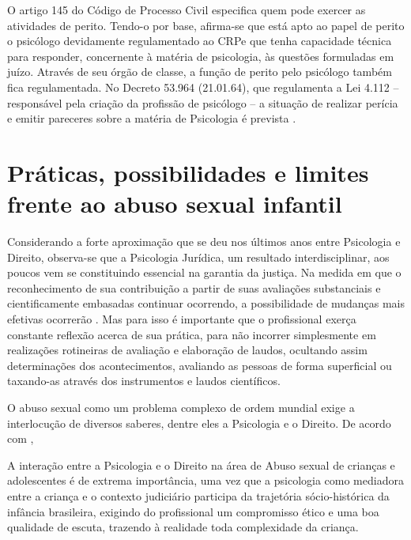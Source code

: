 O artigo 145 do Código de Processo Civil especifica quem pode exercer as atividades de perito. Tendo-o por base, afirma-se que está apto ao papel de perito o psicólogo devidamente regulamentado ao CRP\footnotemark e que tenha capacidade técnica para responder, concernente à matéria de psicologia, às questões formuladas em juízo. Através de seu órgão de classe, a função de perito pelo psicólogo também fica regulamentada. No Decreto 53.964 (21.01.64), que regulamenta a Lei 4.112 --  responsável pela criação da profissão de psicólogo -- a situação de realizar perícia e emitir pareceres sobre a matéria de Psicologia é prevista \cite{ROVINSKI2004}.


\section{Práticas, possibilidades e limites frente ao abuso sexual infantil}

Considerando a forte aproximação que se deu nos últimos anos entre Psicologia e Direito, observa-se que a Psicologia Jurídica, um resultado interdisciplinar, aos poucos vem se constituindo essencial na garantia da justiça. Na medida em que o reconhecimento de sua contribuição a partir de suas avaliações substanciais e cientificamente embasadas continuar ocorrendo, a possibilidade de mudanças mais efetivas ocorrerão . Mas para isso é importante que o profissional exerça constante reflexão acerca de sua prática, para não incorrer simplesmente em realizações rotineiras de avaliação e elaboração de laudos, ocultando assim determinações dos acontecimentos, avaliando as pessoas de forma superficial ou taxando-as através dos instrumentos e laudos científicos.

O abuso sexual como um problema complexo de ordem mundial exige a interlocução de diversos saberes, dentre eles a Psicologia e o Direito. De acordo com , 

\begin{citacao}
	A interação entre a Psicologia e o Direito na área de Abuso sexual de crianças e adolescentes é de extrema importância, uma vez que a psicologia como mediadora entre a criança e o contexto judiciário participa da trajetória sócio-histórica da infância brasileira, exigindo do profissional um compromisso ético e uma boa qualidade de escuta, trazendo à realidade toda complexidade da criança.
\end{citacao}

